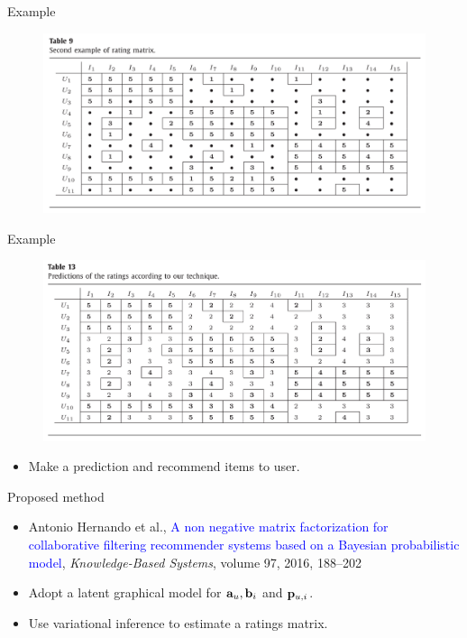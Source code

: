 \documentclass{beamer}
\begin{document}
\begin{frame}{Example}
	\begin{figure}
		\centering
		\includegraphics[width=0.9\linewidth]{fig/Table9}
		\label{fig:table9}
	\end{figure}
\end{frame}

\begin{frame}{Example}
	\begin{figure}
		\centering
		\includegraphics[width=0.9\linewidth]{fig/Table13}
		\label{fig:table13}
	\end{figure}
	\begin{itemize}
		\item Make a prediction and recommend items to user.
	\end{itemize}
\end{frame}

\begin{frame}{Proposed method}
    \begin{itemize}
        \item Antonio Hernando et al., 
        \textcolor{blue}{A non negative matrix factorization for collaborative filtering recommender systems based on a Bayesian probabilistic model}, \textit{Knowledge-Based Systems}, volume 97, 2016, 188–202
        \item Adopt a latent graphical model for $\mathbf a_u, \mathbf b_i$ and $ \mathbf p_{u, i} $.
        \item Use variational inference to estimate a ratings matrix.
    \end{itemize}
\end{frame}
\end{document}
